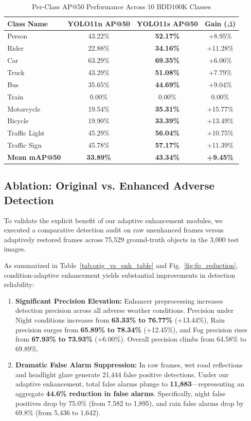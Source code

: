 \documentclass[conference]{IEEEtran}
\begin{document}
\begin{table}[htbp]
\caption{Per-Class AP@50 Performance Across 10 BDD100K Classes}
\label{tab:per_class_metrics}
\centering
\small
\begin{tabular}{lccc}
\toprule
\textbf{Class Name} & \textbf{YOLO11n AP@50} & \textbf{YOLO11s AP@50} & \textbf{Gain ($\Delta$)} \\
\midrule
Person & 43.22\% & \textbf{52.17\%} & +8.95\% \\
Rider & 22.88\% & \textbf{34.16\%} & +11.28\% \\
Car & 63.29\% & \textbf{69.35\%} & +6.06\% \\
Truck & 43.29\% & \textbf{51.08\%} & +7.79\% \\
Bus & 35.65\% & \textbf{44.69\%} & +9.04\% \\
Train & 0.00\% & 0.00\% & 0.00\% \\
Motorcycle & 19.54\% & \textbf{35.31\%} & +15.77\% \\
Bicycle & 19.90\% & \textbf{33.39\%} & +13.49\% \\
Traffic Light & 45.29\% & \textbf{56.04\%} & +10.75\% \\
Traffic Sign & 45.78\% & \textbf{57.17\%} & +11.39\% \\
\midrule
\textbf{Mean mAP@50} & \textbf{33.89\%} & \textbf{43.34\%} & \textbf{+9.45\%} \\
\bottomrule
\end{tabular}
\end{table}

\subsection{Ablation: Original vs. Enhanced Adverse Detection}
To validate the explicit benefit of our adaptive enhancement modules, we executed a comparative detection audit on raw unenhanced frames versus adaptively restored frames across 75,529 ground-truth objects in the 3,000 test images. 

As summarized in Table~\ref{tab:orig_vs_enh_table} and Fig.~\ref{fig:fp_reduction}, condition-adaptive enhancement yields substantial improvements in detection reliability:
\begin{enumerate}
    \item \textbf{Significant Precision Elevation:} Enhancer preprocessing increases detection precision across all adverse weather conditions. Precision under Night conditions increases from \textbf{63.33\% to 76.77\%} (+13.44\%), Rain precision surges from \textbf{65.89\% to 78.34\%} (+12.45\%), and Fog precision rises from \textbf{67.93\% to 73.93\%} (+6.00\%). Overall precision climbs from 64.58\% to 69.89\%.
    \item \textbf{Dramatic False Alarm Suppression:} In raw frames, wet road reflections and headlight glare generate 21,444 false positive detections. Under our adaptive enhancement, total false alarms plunge to \textbf{11,883}---representing an aggregate \textbf{44.6\% reduction in false alarms}. Specifically, night false positives drop by 75.0\% (from 7,582 to 1,895), and rain false alarms drop by 69.8\% (from 5,436 to 1,642).
\end{enumerate}
\end{document}
